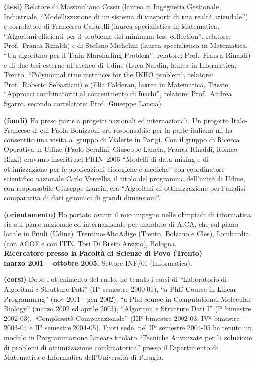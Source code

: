 \documentclass[10pt]{article}
\newcommand{\subvoice}[1] { {\large \bf #1} \smallskip\\ }
\begin{document}
{\bf (tesi)} Relatore di Massimiliano Cossu
(laurea in Ingegneria Gestionale Industriale,
``Modellizzazione di un sistema di trasporti di una realt\`a aziendale'')
e correlatore di Francesco Cafarelli
(laurea specialistica in Matematica,
``Algoritmi efficienti per il problema del minimum test collection'',
relatore: Prof.~Franca Rinaldi)
e di Stefano Michelini (laurea specialistica in Matematica, ``Un algoritmo per il Train Marshalling Problem'', relatore: Prof.~Franca Rinaldi) %
e di due tesi esterne all'ateneo di Udine
(Luca Nardin, laurea in Informatica, Trento,%
``Polynomial time instances for the IKHO problem'',
relatore: Prof.~Roberto Sebastiani)
e (Elia Calderan, laurea in Matematica, Trieste,%
``Approcci combinatorici al contenimento di fuochi'',
relatore: Prof.~Andrea Sgarro,
secondo correlatore: Prof.~Giuseppe Lancia).

{\bf (fondi)} Ho preso parte a progetti nazionali ed internazionali.
Un progetto Italo-Francese di cui Paola Bonizzoni era responsabile per la parte italiana
mi ha consentito una visita al gruppo di Vialette in Parigi.
Con il gruppo di Ricerca Operativa in Udine (Paolo Serafini, Giuseppe Lancia, Franca Rinaldi, Romeo Rizzi) eravamo inseriti nel PRIN~2006 ``Modelli di data mining e di ottimizzazione per le applicazioni biologiche e mediche'' con coordinatore scientifico nazionale Carlo Vercellis, il titolo del programma dell'unit\'a di Udine, con responsabile Giuseppe Lancia,
era ``Algoritmi di ottimizzazione per l'analisi comparativa di dati genomici di grandi dimensioni''.

{\bf (orientamento)} Ho portato avanti il mio impegno nelle olimpiadi di informatica,
sia sul piano nazionale ed internazionale per mandato di AICA,
che sul piano locale in Friuli (Udine), Trentino-AltoAdige (Trento, Bolzano e Cles), Lombardia (con ACOF e con l'ITC Tosi Di Busto Arsizio), Bologna.\\



\subvoice{Ricercatore presso la
          Facolt\`a di Scienze di Povo (Trento)}
{\bf marzo 2001 -- ottobre 2005.}
Settore INF/01 (Informatica).

{\bf (corsi)} Dopo l'ottenimento del ruolo,
ho tenuto i corsi di ``Laboratorio di Algoritmi e Strutture Dati''
(II$^o$ semestre 2000-01),
``a PhD Course in Linear Programming'' (nov 2001 - gen 2002),
``a Phd course in Computational Molecular Biology'' (marzo 2002 ed aprile 2003),
``Algoritmi e Strutture Dati I'' (I$^o$ bimestre 2002-03),
``Complessit\`a Computazionale'' (III$^o$ bimestre 2002-03,
IV$^o$ bimestre 2003-04 e II$^o$ semestre 2004-05).
Fuori sede, nel II$^o$ semestre 2004-05
ho tenuto un modulo in Programmazione Lineare
titolato ``Tecniche Anvanzate per la soluzione di problemi di ottimizzazione
combinatorica''
presso il Dipartimento di Matematica e Informatica
dell'Universit\`a di Perugia.
\end{document}

